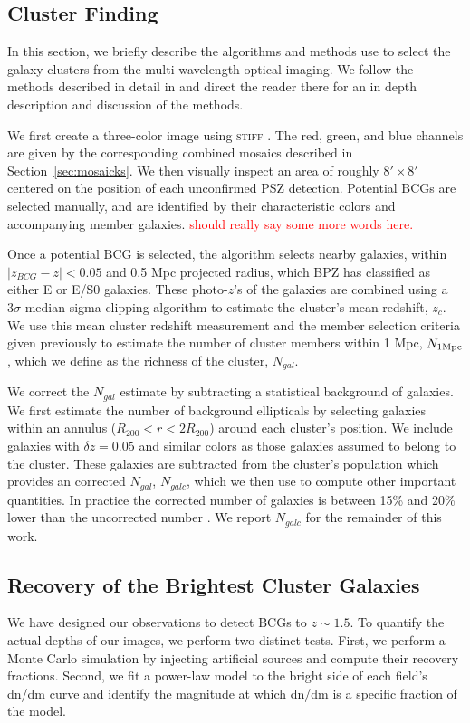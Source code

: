 \documentclass[apj, revtex4-1]{emulateapj}
\newcommand{\editorial}[1]{\textcolor{red}{#1}}
\begin{document}
\subsection{Cluster Finding}
In this section, we briefly describe the algorithms and methods use to select the galaxy clusters from the multi-wavelength optical imaging. We follow the methods described in detail in \cite{Menanteau2009a, Menanteau2010} and direct the reader there for an in depth description and discussion of the methods.

We first create a three-color image using \textsc{stiff} \citep{Bertin2011}. The red, green, and blue channels are given by the corresponding combined mosaics described in Section~\ref{sec:mosaicks}. We then visually inspect an area of roughly $8' \times 8'$ centered on the position of each unconfirmed PSZ detection. Potential BCGs are selected manually, and are identified by their characteristic colors and accompanying member galaxies. \editorial{should really say some more words here.}

Once a potential BCG is selected, the algorithm selects nearby galaxies, within $|z_{BCG} - z| < 0.05$ and 0.5 Mpc projected radius, which BPZ has classified as either E or E/S0 galaxies. These photo-$z$'s of the galaxies are combined using a $3\sigma$ median sigma-clipping algorithm to estimate the cluster's mean redshift, $z_c$. We use this mean cluster redshift measurement and the member selection criteria given previously to estimate the number of cluster members within 1 Mpc, $N_{1\rm Mpc}$, which we define as the richness of the cluster, $N_{gal}$.

We correct the $N_{gal}$ estimate by subtracting a statistical background of galaxies. We first estimate the number of background ellipticals by selecting galaxies within an annulus ($R_{200} <r < 2R_{200}$) around each cluster's position. We include galaxies with $\delta z = 0.05$ and similar colors as those galaxies assumed to belong to the cluster. These galaxies are subtracted from the cluster's population which provides an corrected $N_{gal}$, $N_{galc}$, which we then use to compute other important quantities. In practice the corrected number of galaxies is between 15\% and 20\% lower than the uncorrected number \citep{Menanteau2010}. We report $N_{galc}$ for the remainder of this work.

\subsection{Recovery of the Brightest Cluster Galaxies}
We have designed our observations to detect BCGs to $z\sim1.5$. To quantify the actual depths of our images, we perform two distinct tests. First, we perform a Monte Carlo simulation by injecting artificial sources and compute their recovery fractions. Second, we fit a power-law model to the bright side of each field's dn/dm curve and identify the magnitude at which dn/dm is a specific fraction of the model.
\end{document}

